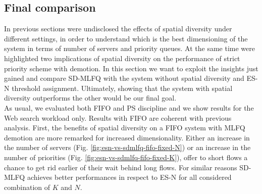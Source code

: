 \subsection{Final comparison}
\label{sec:final-comparison}
In previous sections were undisclosed the effects of spatial diversity under different settings, in order to understand which is the best dimensioning of the system in terms of number of servers and priority queues. At the same time were highlighted two implications of spatial diversity on the performance of strict priority scheme with demotion. In this section we want to exploit the insights just gained and compare SD-MLFQ with the system without spatial diversity and ES-N threshold assignment. Ultimately, showing that the system with spatial diversity outperforms the other would be our final goal. \\
As usual, we evaluated both FIFO and PS discipline and we show results for the Web search workload only. Results with FIFO are coherent with previous analysis. First, the benefits of spatial diversity on a FIFO system with MLFQ demotion are more remarked for increased dimensionality. Either an increase in the number of servers (Fig. \ref{fig:esn-vs-sdmlfq-fifo-fixed-N}) or an increase in the number of priorities (Fig. \ref{fig:esn-vs-sdmlfq-fifo-fixed-K}), offer to short flows a chance to get rid earlier of their wait behind long flows. For similar reasons SD-MLFQ achieves better performances in respect to ES-N for all considered combination of $K$ and $N$.

